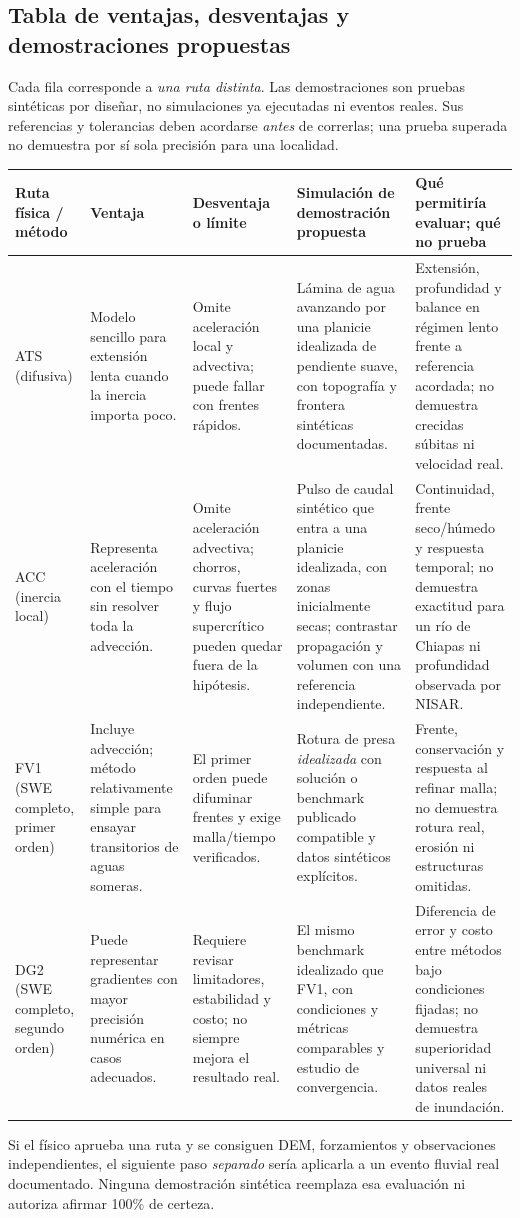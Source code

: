 \documentclass[11pt,a4paper]{article}
\begin{document}
\subsection{Tabla de ventajas, desventajas y demostraciones propuestas}
Cada fila corresponde a \emph{una ruta distinta}. Las demostraciones son pruebas sintéticas por diseñar, no simulaciones ya ejecutadas ni eventos reales. Sus referencias y tolerancias deben acordarse \emph{antes} de correrlas; una prueba superada no demuestra por sí sola precisión para una localidad.
\begin{landscape}
\footnotesize
\begin{longtable}{p{.12\linewidth}p{.18\linewidth}p{.20\linewidth}p{.23\linewidth}p{.19\linewidth}}
\toprule Ruta física / método & Ventaja & Desventaja o límite & Simulación de demostración propuesta & Qué permitiría evaluar; qué no prueba\\\midrule
\endhead
ATS (difusiva) & Modelo sencillo para extensión lenta cuando la inercia importa poco. & Omite aceleración local y advectiva; puede fallar con frentes rápidos. & Lámina de agua avanzando por una planicie idealizada de pendiente suave, con topografía y frontera sintéticas documentadas. & Extensión, profundidad y balance en régimen lento frente a referencia acordada; no demuestra crecidas súbitas ni velocidad real.\\
ACC (inercia local) & Representa aceleración con el tiempo sin resolver toda la advección. & Omite aceleración advectiva; chorros, curvas fuertes y flujo supercrítico pueden quedar fuera de la hipótesis. & Pulso de caudal sintético que entra a una planicie idealizada, con zonas inicialmente secas; contrastar propagación y volumen con una referencia independiente. & Continuidad, frente seco/húmedo y respuesta temporal; no demuestra exactitud para un río de Chiapas ni profundidad observada por NISAR.\\
FV1 (SWE completo, primer orden) & Incluye advección; método relativamente simple para ensayar transitorios de aguas someras. & El primer orden puede difuminar frentes y exige malla/tiempo verificados. & Rotura de presa \emph{idealizada} con solución o benchmark publicado compatible y datos sintéticos explícitos. & Frente, conservación y respuesta al refinar malla; no demuestra rotura real, erosión ni estructuras omitidas.\\
DG2 (SWE completo, segundo orden) & Puede representar gradientes con mayor precisión numérica en casos adecuados. & Requiere revisar limitadores, estabilidad y costo; no siempre mejora el resultado real. & El mismo benchmark idealizado que FV1, con condiciones y métricas comparables y estudio de convergencia. & Diferencia de error y costo entre métodos bajo condiciones fijadas; no demuestra superioridad universal ni datos reales de inundación.\\
\bottomrule
\end{longtable}
\end{landscape}
\normalsize
Si el físico aprueba una ruta y se consiguen DEM, forzamientos y observaciones independientes, el siguiente paso \emph{separado} sería aplicarla a un evento fluvial real documentado. Ninguna demostración sintética reemplaza esa evaluación ni autoriza afirmar 100\% de certeza.
\end{document}
